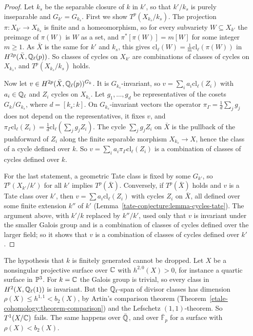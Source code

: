 \begin{proof}
Let $k_s$ be the separable closure of $k$ in $k'$, so that $k'/k_s$ is purely inseparable and $G_{k'} = G_{k_s}$. First we show $T^p(X_{k_s}/k_s)$. The projection $\pi \colon X_{k'} \to X_{k_s}$ is finite and a
homeomorphism, so for every subvariety $W \subseteq X_{k'}$ the preimage of $\pi(W)$ is $W$ as a set, and $\pi^*[\pi(W)] = m[W]$ for some integer $m \geq 1$. As $\bar X$ is the same for $k'$ and $k_s$, this gives
$\mathrm{cl}_\ell(W) = \frac1m\mathrm{cl}_\ell(\pi(W))$ in $H^{2p}(\bar X, \mathbb{Q}_\ell(p))$. So classes of cycles on $X_{k'}$ are combinations of classes of cycles on $X_{k_s}$, and $T^p(X_{k_s}/k_s)$ holds.

Now let $v \in H^{2p}(\bar X, \mathbb{Q}_\ell(p))^{G_k}$. It is $G_{k_s}$-invariant, so $v = \sum_ia_i\mathrm{cl}_\ell(Z_i)$ with $a_i \in \mathbb{Q}_\ell$ and $Z_i$ cycles on $X_{k_s}$. Let $g_1, \ldots, g_d$ be representatives of the cosets
$G_k/G_{k_s}$, where $d = [k_s : k]$. On $G_{k_s}$-invariant vectors the operator $\pi_\Gamma = \frac1d\sum_jg_j$ does not depend on the representatives, it fixes $v$, and
$\pi_\Gamma\mathrm{cl}_\ell(Z_i) = \frac1d\mathrm{cl}_\ell(\sum_jg_jZ_i)$. The cycle $\sum_jg_jZ_i$ on $\bar X$ is the pullback of the pushforward of $Z_i$ along the finite separable morphism $X_{k_s} \to X$, hence
the class of a cycle defined over $k$. So $v = \sum_ia_i\pi_\Gamma\mathrm{cl}_\ell(Z_i)$ is a combination of classes of cycles defined over $k$.

For the last statement, a geometric Tate class is fixed by some $G_{k'}$, so $T^p(X_{k'}/k')$ for all $k'$ implies $T^p(\bar X)$. Conversely, if $T^p(\bar X)$ holds and $v$ is a Tate class over $k'$, then
$v = \sum a_i\mathrm{cl}_\ell(Z_i)$ with cycles $Z_i$ on $\bar X$, all defined over some finite extension $k''$ of $k'$ (Lemma~\ref{tate-conjecture:lemma-cycles-tate}). The argument above, with $k'/k$ replaced
by $k''/k'$, used only that $v$ is invariant under the smaller Galois group and is a combination of classes of cycles defined over the larger field; so it shows that $v$ is a combination of classes of
cycles defined over $k'$.
\end{proof}

\begin{counterexample}\label{tate-conjecture:counterexample-algebraically-closed}
The hypothesis that $k$ is finitely generated cannot be dropped. Let $X$ be a nonsingular projective surface over $\mathbb{C}$ with $h^{2,0}(X) > 0$, for instance a quartic surface in $\mathbb{P}^3$. For $k = \mathbb{C}$ the Galois
group is trivial, so every class in $H^2(X, \mathbb{Q}_\ell(1))$ is invariant. But the $\mathbb{Q}_\ell$-span of divisor classes has dimension $\rho(X) \leq h^{1,1} < b_2(X)$, by Artin's comparison theorem
(Theorem~\ref{etale-cohomology:theorem-comparison}) and the Lefschetz $(1,1)$-theorem. So $T^1(X/\mathbb{C})$ fails. The same happens over $\bar{\mathbb{Q}}$, and over $\bar{\mathbb{F}}_p$ for a surface with
$\rho(X) < b_2(X)$.
\end{counterexample}

